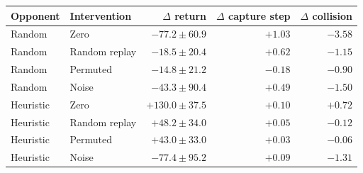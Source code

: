 \begin{tabular}{llrrr}
\toprule
Opponent & Intervention & \(\Delta\) return & \(\Delta\) capture step & \(\Delta\) collision \\
\midrule
Random & Zero & \(-77.2 \pm 60.9\) & \(+1.03\) & \(-3.58\) \\
Random & Random replay & \(-18.5 \pm 20.4\) & \(+0.62\) & \(-1.15\) \\
Random & Permuted & \(-14.8 \pm 21.2\) & \(-0.18\) & \(-0.90\) \\
Random & Noise & \(-43.3 \pm 90.4\) & \(+0.49\) & \(-1.50\) \\
\midrule
Heuristic & Zero & \(+130.0 \pm 37.5\) & \(+0.10\) & \(+0.72\) \\
Heuristic & Random replay & \(+48.2 \pm 34.0\) & \(+0.05\) & \(-0.12\) \\
Heuristic & Permuted & \(+43.0 \pm 33.0\) & \(+0.03\) & \(-0.06\) \\
Heuristic & Noise & \(-77.4 \pm 95.2\) & \(+0.09\) & \(-1.31\) \\
\bottomrule
\end{tabular}
